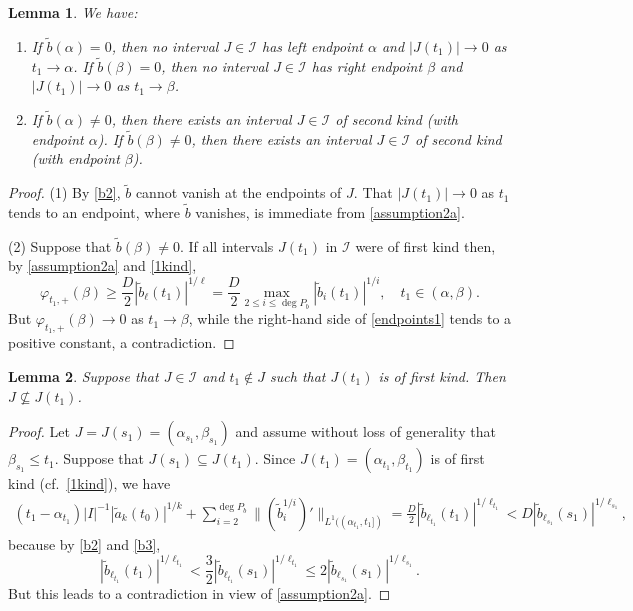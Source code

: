 \documentclass[12pt]{amsart}
\theoremstyle{plain}
\newtheorem{lemma}{Lemma}
\theoremstyle{definition}
\numberwithin{equation}{section}
\begin{document}
\begin{lemma} \label{endpoints} We have:
\begin{enumerate}
  \item If $\tilde b({\alpha}) = 0$, then no interval $J \in {\mathcal{I}}$ has left endpoint ${\alpha}$ and $|J(t_1)| \to 0$ as $t_1 \to {\alpha}$. 
  If $\tilde b({\beta}) = 0$, then no interval $J \in {\mathcal{I}}$ has right endpoint ${\beta}$ and $|J(t_1)| \to 0$ as $t_1 \to {\beta}$. 
  \item If $\tilde b({\alpha}) \ne 0$, then there exists an interval $J \in {\mathcal{I}}$ of second kind (with endpoint ${\alpha}$). 
  If $\tilde b({\beta}) \ne 0$, then there exists an interval $J \in {\mathcal{I}}$ of second kind (with endpoint ${\beta}$).
\end{enumerate}
\end{lemma}

\begin{proof}
  (1) By \eqref{b2}, $\tilde b$ cannot vanish at the endpoints of $J$. 
  That $|J(t_1)| \to 0$ as $t_1$ tends to an endpoint, where $\tilde b$ vanishes, is immediate from \eqref{assumption2a}.

  (2) Suppose that $\tilde b({\beta}) \ne 0$. If all intervals $J(t_1)$ in ${\mathcal{I}}$ were of first kind then, by \eqref{assumption2a} and \eqref{1kind}, 
  \begin{equation} \label{endpoints1}
    {\varphi}_{t_1,+}({\beta}) \ge \frac{D}{2} |\tilde b_\ell(t_1)|^{1/\ell} 
    = \frac{D}{2} \max_{2 \le i \le \deg P_b} |\tilde b_i(t_1)|^{1/i}, \quad t_1 \in ({\alpha},{\beta}).
  \end{equation}
  But ${\varphi}_{t_1,+}({\beta}) \to 0$ as $t_1 \to {\beta}$, while the right-hand side of \eqref{endpoints1} tends to a positive constant, a contradiction. 
\end{proof}

\begin{lemma} \label{lem:interlace}
  Suppose that $J \in {\mathcal{I}}$ and $t_1 \not\in J$ such that $J(t_1)$ is of first kind. 
  Then $J \not \subseteq J(t_1)$.
\end{lemma}

\begin{proof}
  Let $J=J(s_1) = ({\alpha}_{s_1},{\beta}_{s_1})$ and assume without loss of generality that ${\beta}_{s_1} \le t_1$. 
  Suppose that $J(s_1) \subseteq J(t_1)$.
  Since $J(t_1)=({\alpha}_{t_1},{\beta}_{t_1})$ is of first kind (cf.\ \eqref{1kind}), we have 
  \begin{align*}
    (t_1 -{\alpha}_{t_1})  |I|^{-1}  {|\tilde a_k(t_0)|^{1/k}}  + \sum_{i=2}^{\deg P_b} \|(\tilde b_i^{1/i})'\|_{L^1 (({\alpha}_{t_1},t_1])} 
    =  \frac{D}{2} |\tilde b_{\ell_{t_1}}(t_1)|^{1/\ell_{t_1}} 
    < D |\tilde b_{\ell_{s_1}}(s_1)|^{1/\ell_{s_1}},
  \end{align*}
  because by \eqref{b2} and \eqref{b3},
  \[
    |\tilde b_{\ell_{t_1}}(t_1)|^{1/\ell_{t_1}} < \frac 3 2 |\tilde b_{\ell_{t_1}}(s_1)|^{1/\ell_{t_1}} 
    \le 2 |\tilde b_{\ell_{s_1}}(s_1)|^{1/\ell_{s_1}}. 
  \]
  But this leads to a contradiction in view of \eqref{assumption2a}.
\end{proof}
\end{document}
